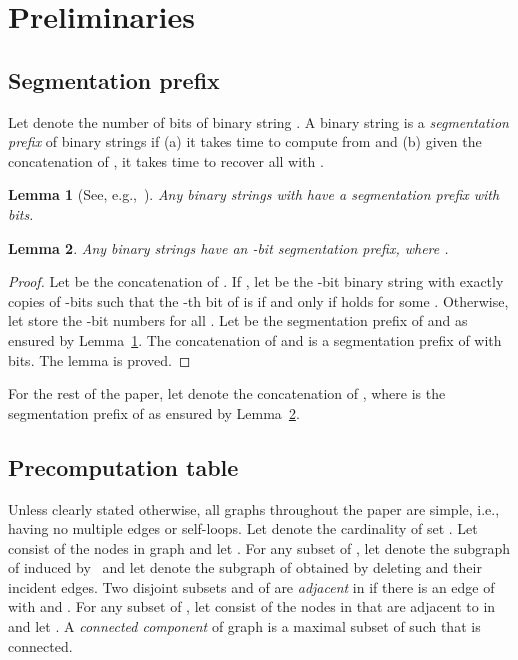 \documentclass[12pt]{article}
\newtheorem{lemma}{Lemma}[section]
\begin{document}
\section{Preliminaries}
\label{section:prelim}

\subsection{Segmentation prefix}
Let  denote the number of bits of binary string .  A binary
string  is a {\em segmentation prefix} of binary strings
 if (a) it takes  time to
compute  from  and (b) given the concatenation of
, it takes  time to
recover all  with .

\begin{lemma}[See, e.g.,~\cite{BellCW90,Elias75}]
\label{lemma:concat}
Any binary strings  with  have a segmentation
prefix with  bits.
\end{lemma}

\begin{lemma}
\label{lemma:unary-concat}
Any binary strings  have an -bit segmentation prefix, where .
\end{lemma}

\begin{proof}
Let  be the concatenation of .  If ,
let  be the -bit binary string with exactly  copies of
-bits such that the -th bit of  is  if and only if
 holds for some .  Otherwise,
let  store the -bit numbers 
for all .  Let  be the segmentation prefix of 
and  as ensured by Lemma~\ref{lemma:concat}.  The concatenation of
 and  is a segmentation prefix  of 
with  bits.  The lemma is proved.
\end{proof}

\noindent
For the rest of the paper, let  denote the
concatenation of , where  is the segmentation
prefix of  as ensured by
Lemma~\ref{lemma:unary-concat}.

\subsection{Precomputation table}

Unless clearly stated otherwise, all graphs throughout the paper are
simple, i.e., having no multiple edges or self-loops.  
Let  denote the cardinality of set .  Let  consist of
the nodes in graph  and let .  For any subset 
of , let  denote the subgraph of  induced by~ and
let  denote the subgraph of  obtained by deleting 
and their incident edges.  Two disjoint subsets  and  of
 are {\em adjacent} in  if there is an edge  of 
with  and .  For any subset  of , let
 consist of the nodes in  that are adjacent
to  in  and let .  A {\em connected
  component} of graph  is a maximal subset  of  such that
 is connected.
\end{document}
